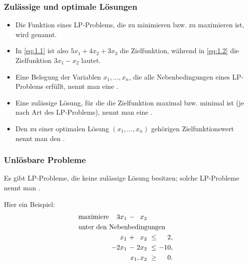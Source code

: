 \documentclass[smaller]{beamer}
\begin{document}
\begin{frame}
 \frametitle{Zul\"assige und optimale L\"osungen}
 \begin{itemize}
 \item Die Funktion eines LP-Problems, die zu minimieren bzw. zu maximieren ist, wird  genannt. 

 \item In \eqref{eq:1.1} ist also $5x_1 + 4x_2 + 3x_3$ die Zielfunktion, während in \eqref{eq:1.2} die Zielfunktion $3x_1 − x_2$ lautet. 

 \item Eine Belegung der Variablen $x_1,\ldots, x_n$, die alle Nebenbedingungen eines LP-Problems erfüllt, nennt man eine .

 \item Eine zulässige Lösung, für die die Zielfunktion maximal bzw. minimal ist (je nach Art des LP-Problems), nennt man eine . 
  
 \item Den zu einer optimalen Lösung $(x_1, \ldots, x_n)$ gehörigen Zielfunktionswert nennt man den .
 \end{itemize}
\end{frame}

\begin{frame}
 \frametitle{Unl\"osbare Probleme}
 Es gibt LP-Probleme, die keine zulässige Lösung besitzen; solche LP-Probleme nennt man . 
 
 Hier ein Beispiel:
\begin{align*}
\begin{alignedat}{4}
& \text{maximiere } & 3x_1 &\ - &\ x_2 & & \\
& \rlap{unter den Nebenbedingungen} & & & & & \\
&&   x_1 &\ + &\  x_2 &\ \leq &\   2,\ \\
&& -2x_1 &\ - &\ 2x_2 &\ \leq &\ -10,\ \\
&& & & \llap{$x_1, x_2$} &\ \geq &\ 0.\ 
\end{alignedat}
\end{align*}
\end{frame}
\end{document}
